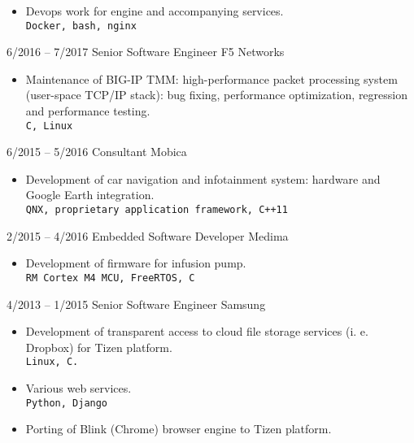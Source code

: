 \documentclass[8pt]{developercv} %
\begin{document}
\begin{entrylist}
{\begin{itemize}
                    \texttt{Elasticseach, Python}
                  \item Devops work for engine and accompanying services.\\
                    \texttt{Docker, bash, nginx}
                 \end{itemize}
                }
	\entry
		{6/2016 -- 7/2017}
		{Senior Software Engineer}
		{F5 Networks}
		{\begin{itemize}
                  \item Maintenance of BIG-IP TMM: high-performance packet
                    processing system (user-space TCP/IP stack): bug fixing,
                    performance optimization, regression and performance
                    testing.\\
                    \texttt{C, Linux}
                  \end{itemize}
                }
	\entry
		{6/2015 -- 5/2016}
		{Consultant}
		{Mobica}
		{\begin{itemize}
                  \item Development of car navigation and infotainment system:
                    hardware and Google Earth integration.\\
                    \texttt{QNX, proprietary application framework, C++11}
                  \end{itemize}
                }
	\entry
		{2/2015 -- 4/2016}
		{Embedded Software Developer}
		{Medima}
		{
                  \begin{itemize}
                  \item Development of firmware for infusion pump.\\
                    \texttt{RM Cortex M4 MCU, FreeRTOS, C}
                  \end{itemize}
                }
	\entry
		{4/2013 -- 1/2015}
		{Senior Software Engineer}
		{Samsung}
		{\begin{itemize}
                  \item Development of transparent access to cloud file storage
                    services (i. e. Dropbox) for Tizen platform.\\
                    \texttt{Linux, C.}
                  \item Various web services.\\
                    \texttt{Python, Django}
                  \item Porting of Blink (Chrome) browser engine
                    to Tizen platform.\\

\end{itemize}}
\end{entrylist}
\end{document}
